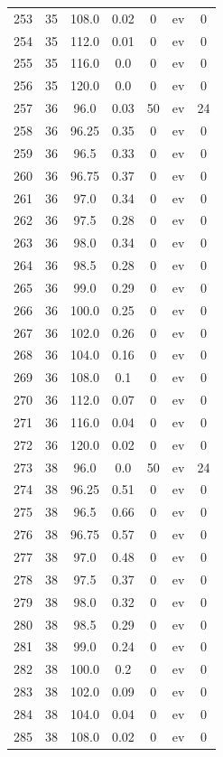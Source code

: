 \documentclass[12pt,a4paper]{article}
\begin{document}
\begin{tabular}{r|cccccc}
	253 & 35 & 108.0 & 0.02 & 0 & ev & 0 \\
	254 & 35 & 112.0 & 0.01 & 0 & ev & 0 \\
	255 & 35 & 116.0 & 0.0 & 0 & ev & 0 \\
	256 & 35 & 120.0 & 0.0 & 0 & ev & 0 \\
	257 & 36 & 96.0 & 0.03 & 50 & ev & 24 \\
	258 & 36 & 96.25 & 0.35 & 0 & ev & 0 \\
	259 & 36 & 96.5 & 0.33 & 0 & ev & 0 \\
	260 & 36 & 96.75 & 0.37 & 0 & ev & 0 \\
	261 & 36 & 97.0 & 0.34 & 0 & ev & 0 \\
	262 & 36 & 97.5 & 0.28 & 0 & ev & 0 \\
	263 & 36 & 98.0 & 0.34 & 0 & ev & 0 \\
	264 & 36 & 98.5 & 0.28 & 0 & ev & 0 \\
	265 & 36 & 99.0 & 0.29 & 0 & ev & 0 \\
	266 & 36 & 100.0 & 0.25 & 0 & ev & 0 \\
	267 & 36 & 102.0 & 0.26 & 0 & ev & 0 \\
	268 & 36 & 104.0 & 0.16 & 0 & ev & 0 \\
	269 & 36 & 108.0 & 0.1 & 0 & ev & 0 \\
	270 & 36 & 112.0 & 0.07 & 0 & ev & 0 \\
	271 & 36 & 116.0 & 0.04 & 0 & ev & 0 \\
	272 & 36 & 120.0 & 0.02 & 0 & ev & 0 \\
	273 & 38 & 96.0 & 0.0 & 50 & ev & 24 \\
	274 & 38 & 96.25 & 0.51 & 0 & ev & 0 \\
	275 & 38 & 96.5 & 0.66 & 0 & ev & 0 \\
	276 & 38 & 96.75 & 0.57 & 0 & ev & 0 \\
	277 & 38 & 97.0 & 0.48 & 0 & ev & 0 \\
	278 & 38 & 97.5 & 0.37 & 0 & ev & 0 \\
	279 & 38 & 98.0 & 0.32 & 0 & ev & 0 \\
	280 & 38 & 98.5 & 0.29 & 0 & ev & 0 \\
	281 & 38 & 99.0 & 0.24 & 0 & ev & 0 \\
	282 & 38 & 100.0 & 0.2 & 0 & ev & 0 \\
	283 & 38 & 102.0 & 0.09 & 0 & ev & 0 \\
	284 & 38 & 104.0 & 0.04 & 0 & ev & 0 \\
	285 & 38 & 108.0 & 0.02 & 0 & ev & 0 \\

\end{tabular}
\end{document}
